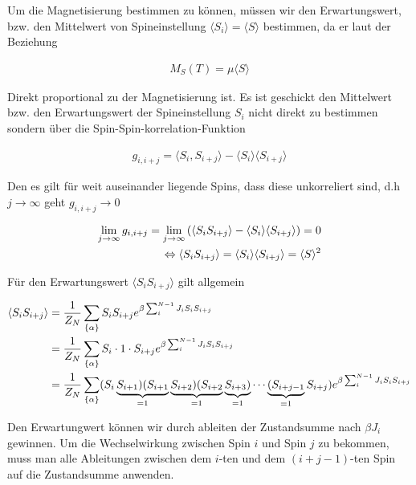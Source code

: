 Um die Magnetisierung bestimmen zu können, müssen wir den Erwartungswert, bzw. den Mittelwert von Spineinstellung \(\langle S_i\rangle =\langle S\rangle \) bestimmen, da er laut der Beziehung

\begin{align}
  \label{eq:9}
  M_S(T) = \mu \langle S\rangle
\end{align}

Direkt proportional zu der Magnetisierung ist. Es ist geschickt den Mittelwert bzw. den Erwartungswert der Spineinstellung \(S_i\) nicht direkt zu bestimmen sondern über die Spin-Spin-korrelation-Funktion

\begin{align}
  \label{eq:10}
  g_{i,i+j} = \langle S_i,S_{i+j}\rangle - \langle S_i\rangle\langle S_{i+j}\rangle
\end{align}

Den es gilt für weit auseinander liegende Spins, dass diese unkorreliert sind, d.h \(j\to\infty\) geht \(g_{i,i+j}\to 0\)

\begin{align}
  \label{eq:11}
   \lim_{j\to\infty} g_{i,i+j} = \lim_{j\to\infty}\left( \langle S_iS_{i+j}\rangle - \langle S_i\rangle\langle S_{i+j}\rangle\right) = 0 \notag\\
\Leftrightarrow \langle S_iS_{i+j}\rangle = \langle S_i\rangle\langle S_{i+j}\rangle = \langle S \rangle^2
\end{align}

Für den Erwartungswert \(\langle S_iS_{i+j}\rangle\) gilt allgemein

\begin{align}
  \label{eq:12}
  \langle S_iS_{i+j}\rangle &= \frac{1}{Z_N} \sum_{\{\alpha\}} S_i S_{i+j}  e^{\beta \sum_i^{N-1}J_iS_i S_{i+j} } \notag\\
&= \frac{1}{Z_N} \sum_{\{\alpha\}} S_i \cdot 1\cdot S_{i+j}  e^{\beta \sum_i^{N-1}J_iS_i S_{i+j} } \notag\\
&= \frac{1}{Z_N} \sum_{\{\alpha\}} (S_i\underbr{S_{i+1})(S_{i+1}}_{=1}\underbr{S_{i+2})(S_{i+2}}_{=1}\underbr{S_{i+3})}_{=1}\cdots\underbr{(S_{i+j-1}}_{=1} S_{i+j})  e^{\beta \sum_i^{N-1}J_iS_i S_{i+j} } 
\end{align}

Den Erwartungwert können wir durch ableiten der Zustandsumme nach \(\beta J_i\) gewinnen. Um die Wechselwirkung zwischen Spin \(i\) und Spin \(j\) zu bekommen, muss man alle Ableitungen zwischen dem \(i\)-ten und dem \((i+j-1)\)-ten Spin auf die Zustandsumme anwenden.

